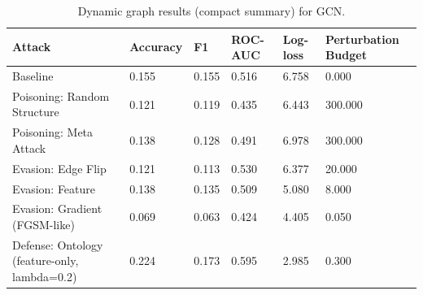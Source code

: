 \begin{table}[t]
\centering
\small
\begin{tabular}{llllll}
\toprule
Attack & Accuracy & F1 & ROC-AUC & Log-loss & Perturbation Budget \\
\midrule
Baseline & 0.155 & 0.155 & 0.516 & 6.758 & 0.000 \\
Poisoning: Random Structure & 0.121 & 0.119 & 0.435 & 6.443 & 300.000 \\
Poisoning: Meta Attack & 0.138 & 0.128 & 0.491 & 6.978 & 300.000 \\
Evasion: Edge Flip & 0.121 & 0.113 & 0.530 & 6.377 & 20.000 \\
Evasion: Feature & 0.138 & 0.135 & 0.509 & 5.080 & 8.000 \\
Evasion: Gradient (FGSM-like) & 0.069 & 0.063 & 0.424 & 4.405 & 0.050 \\
Defense: Ontology (feature-only, lambda=0.2) & 0.224 & 0.173 & 0.595 & 2.985 & 0.300 \\
\bottomrule
\end{tabular}

\caption{Dynamic graph results (compact summary) for GCN.}
\label{tab:dynamic_gcn_summary}
\end{table}
